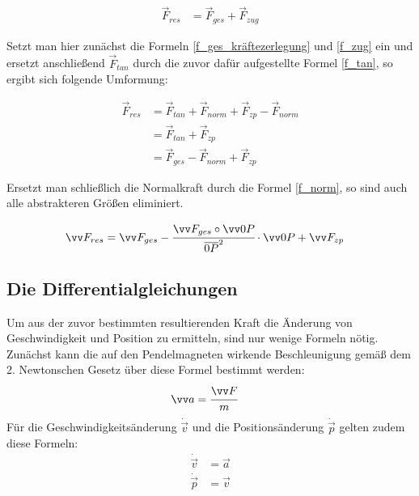 \begin{align*}
    \vec{F}_{res} &= \vec{F}_{ges} + \vec{F}_{zug}
\end{align*}

Setzt man hier zunächst die Formeln \eqref{f_ges_kräftezerlegung} und \eqref{f_zug} ein und ersetzt anschließend $\vec{F}_{tan}$ durch die zuvor dafür aufgestellte Formel \eqref{f_tan}, so ergibt sich folgende Umformung:

\begin{align*}
    \vec{F}_{res} &= \vec{F}_{tan} + \vec{F}_{norm} + \vec{F}_{zp} - \vec{F}_{norm} \\
                  &= \vec{F}_{tan} + \vec{F}_{zp} \\
                  &= \vec{F}_{ges} - \vec{F}_{norm} + \vec{F}_{zp}
\end{align*}

Ersetzt man schließlich die Normalkraft durch die Formel \eqref{f_norm}, so sind auch alle abstrakteren Größen eliminiert.

\begin{align} \label{f_res}
    \vec{F}_{res} &= \vec{F}_{ges} - \cfrac{\vec{F}_{ges} \circ \vec{0P}}{\overline{0P}^2} \cdot \vec{0P} + \vec{F}_{zp}
\end{align}

\subsection{Die Differentialgleichungen}
\label{ssec:die_differentialgleichungen}

Um aus der zuvor bestimmten resultierenden Kraft die Änderung von Geschwindigkeit und Position zu ermitteln, sind nur wenige Formeln nötig. Zunächst kann die auf den Pendelmagneten wirkende Beschleunigung gemäß dem 2. Newtonschen Gesetz über diese Formel bestimmt werden:
\begin{align} \label{a}
	\vec{a} &= \cfrac{\vec{F}}{m}
\end{align}
Für die Geschwindigkeitsänderung $\dot{\vec{v}}$ und die Positionsänderung $\dot{\vec{p}}$ gelten zudem diese Formeln:
\begin{align} \label{v}
	\dot{\vec{v}} &= \vec{a}
\end{align}
\begin{align} \label{p}
    \dot{\vec{p}} &= \vec{v}
\end{align}